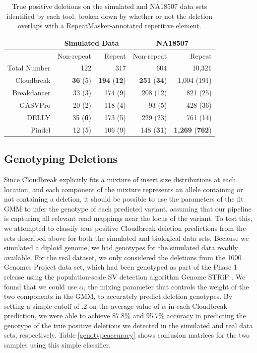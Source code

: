 \documentclass[11pt]{article}
\begin{document}
\begin{table}[b]
\begin{center}
\begin{tabular}{rrr|rr}
 & \multicolumn{2}{c}{Simulated Data} & \multicolumn{2}{c}{NA18507} \\
\hline
 &  Non-repeat & Repeat  &  Non-repeat & Repeat \\ 
 Total Number & 122 & 317 & 604 & 10,321 \\ 
  \hline
Cloudbreak & \textbf{36} (5) & \textbf{194} (\textbf{12}) & \textbf{251} (\textbf{34}) & 1,004 (191) \\ 
  Breakdancer &  33 (3) & 174 (9) & 208 (12) & 821 (25) \\ 
  GASVPro & 20 (2) & 118 (4) & 93 (5) & 428 (36) \\ 
  DELLY & 35 (\textbf{6}) & 173 (5) & 229 (23) & 761 (14) \\ 
  Pindel & 12 (5) & 106 (9) & 148 (\textbf{31}) & \textbf{1,269} (\textbf{762}) \\ 
   \hline
\end{tabular}
\end{center}
\caption{True positive deletions on the simulated and NA18507 data sets identified by each tool, broken down by whether or not the deletion overlaps with a RepeatMasker-annotated repetitive element.}
\label{repmaskpreds}
\end{table}

\subsection{Genotyping Deletions}

Since Cloudbreak explicitly fits a mixture of insert size distributions at each location, and each component of the mixture represents an allele containing or not containing a deletion, it should be possible to use the parameters of the fit GMM to infer the genotype of each predicted variant, assuming that our pipeline is capturing all relevant read mappings near the locus of the variant. To test this, we attempted to classify true positive Cloudbreak deletion predictions from the sets described above for both the simulated and biological data sets. Because we simulated a diploid genome, we had genotypes for the simulated data readily available. For the real dataset, we only considered the deletions from the 1000 Genomes Project data set, which had been genotyped as part of the Phase 1 release using the population-scale SV detection algorithm Genome STRiP \autocite{Handsaker:2011ki}. We found that we could use $\alpha$, the mixing parameter that controls the weight of the two components in the GMM, to accurately predict deletion genotypes. By setting a simple cutoff of .2 on the average value of $\alpha$ in each Cloudbreak prediction, we were able to achieve 87.8\% and 95.7\% accuracy in predicting the genotype of the true positive deletions we detected in the simulated and real data sets, respectively. Table \ref{genotypeaccuracy} shows confusion matrices for the two samples using this simple classifier.
\end{document}
